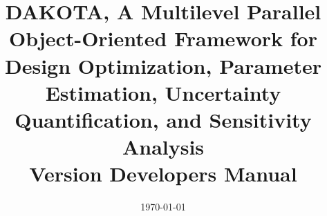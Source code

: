 \documentclass[ps2pdf,11pt,report]{SANDreport}
\title{DAKOTA, A Multilevel Parallel Object-Oriented Framework for 
Design Optimization, Parameter Estimation, Uncertainty Quantification, 
and Sensitivity Analysis\\\vspace{5mm}Version \DakotaVersion\space Developers Manual}
\author{\DakotaAuthorLong}
\date{\today}
\begin{document}
\maketitle

\begin{abstract}
\DakotaAbstractShared
\DakotaAbstractDev
\end{abstract}

\setcounter{page}{3}
\clearemptydoublepage

\tableofcontents
\clearemptydoublepage

\SANDmain 

%   
\end{document}
